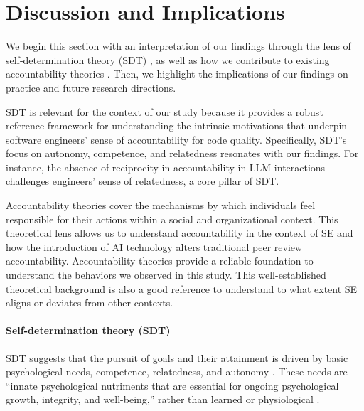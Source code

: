 \section{Discussion and Implications}\label{sec:discussion}

We begin this section with an interpretation of our findings through the lens of self-determination theory (SDT) \citep{deci2000and}, as well as how we contribute to existing accountability theories \cite{frink1998toward,hall2003accountability}. Then, we highlight the implications of our findings on practice and future research directions.

SDT is relevant for the context of our study because it provides a robust reference framework for understanding the intrinsic motivations that underpin software engineers' sense of accountability for code quality. Specifically, SDT's focus on autonomy, competence, and relatedness \citep{deci2000and} resonates with our findings. For instance, the absence of reciprocity in accountability in LLM interactions challenges engineers' sense of relatedness, a core pillar of SDT.

Accountability theories \cite{frink1998toward,hall2003accountability} cover the mechanisms by which individuals feel responsible for their actions within a social and organizational context. This theoretical lens allows us to understand accountability in the context of SE and how the introduction of AI technology alters traditional peer review accountability. Accountability theories provide a reliable foundation to understand the behaviors we observed in this study. This well-established theoretical background is also a good reference to understand to what extent SE aligns or deviates from other contexts.

\paragraph*{Self-determination theory (SDT)} SDT suggests that the pursuit of goals and their attainment is driven by basic psychological needs, competence, relatedness, and autonomy \citep{deci2000and}. These needs are ``innate psychological nutriments that are essential for ongoing psychological growth, integrity, and well-being,'' rather than learned or physiological \citep{deci2000and}.

